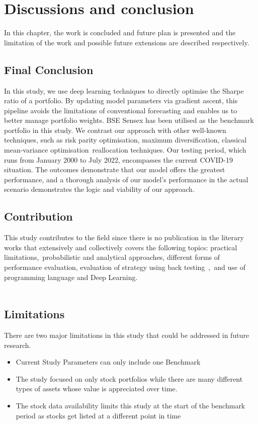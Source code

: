 \chapter{Discussions and conclusion}
In this chapter, the work is concluded and future plan is presented and the limitation of the work and possible future extensions are
described respectively.

\section{Final Conclusion} In this study, we use deep learning techniques to directly optimise the Sharpe ratio of a portfolio. By updating model parameters via gradient ascent, this pipeline avoids the limitations of conventional forecasting and enables us to better manage portfolio weights. BSE Sensex has been utilised as the benchmark portfolio in this study.
We contrast our approach with other well-known techniques, such as risk parity optimisation, maximum diversification, classical mean-variance optimisation reallocation techniques.
Our testing period, which runs from January 2000 to July 2022, encompasses the current COVID-19 situation.
The outcomes demonstrate that our model offers the greatest performance, and a thorough analysis of our model's performance in the actual scenario demonstrates the logic and viability of our approach.
\section{Contribution}
This study contributes to the field since there is no publication in the literary works that extensively and collectively covers the following topics: practical limitations, probabilistic and analytical approaches, different forms of performance evaluation, evaluation of strategy using back testing , and use of programming language and Deep Learning.\\\\
\section{Limitations}
There are two major limitations in this study that could be addressed in future research. \begin{itemize}
    \item Current Study Parameters can only include one Benchmark
    \item The study focused on only stock portfolios while there are many different types of assets whose value is appreciated over time.
    \item The stock data availability limits this study at the start of the benchmark period as stocks get listed at a different point in time
    
\end{itemize} 

